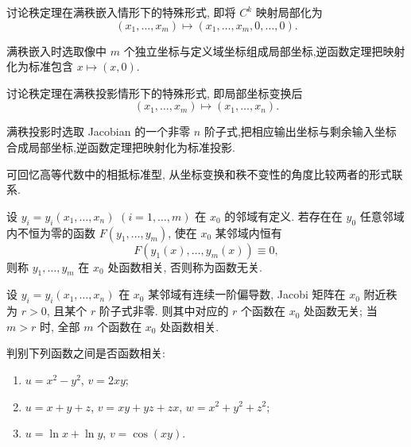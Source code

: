 \begin{example}
    讨论秩定理在满秩嵌入情形下的特殊形式, 即将 $C^k$ 映射局部化为
    \[
        (x_1,\ldots,x_m)\mapsto(x_1,\ldots,x_m,0,\ldots,0).
    \]
\end{example}
\exampleblank

\begin{solution}
    满秩嵌入时选取像中 $m$ 个独立坐标与定义域坐标组成局部坐标,逆函数定理把映射化为标准包含 $x\mapsto(x,0)$.
\end{solution}

\begin{example}
    讨论秩定理在满秩投影情形下的特殊形式, 即局部坐标变换后
    \[
        (x_1,\ldots,x_m)\mapsto(x_1,\ldots,x_n).
    \]
\end{example}
\exampleblank

\begin{solution}
    满秩投影时选取 Jacobian 的一个非零 $n$ 阶子式,把相应输出坐标与剩余输入坐标合成局部坐标,逆函数定理把映射化为标准投影.
\end{solution}

\begin{remark}
    可回忆高等代数中的相抵标准型, 从坐标变换和秩不变性的角度比较两者的形式联系.
\end{remark}




\begin{definition}
    设 $y_i=y_i(x_1,\ldots,x_n)$ $(i=1,\ldots,m)$ 在 $x_0$ 的邻域有定义. 若存在在 $y_0$ 任意邻域内不恒为零的函数 $F(y_1,\ldots,y_m)$, 使在 $x_0$ 某邻域内恒有
    \[
        F(y_1(x),\ldots,y_m(x))\equiv0,
    \]
    则称 $y_1,\ldots,y_m$ 在 $x_0$ 处函数相关, 否则称为函数无关.
\end{definition}

\begin{theorem}[\markstar]
    设 $y_i=y_i(x_1,\ldots,x_n)$ 在 $x_0$ 某邻域有连续一阶偏导数, Jacobi 矩阵在 $x_0$ 附近秩为 $r>0$, 且某个 $r$ 阶子式非零. 则其中对应的 $r$ 个函数在 $x_0$ 处函数无关; 当 $m>r$ 时, 全部 $m$ 个函数在 $x_0$ 处函数相关.
\end{theorem}

\begin{example}
    判别下列函数之间是否函数相关:
    \begin{enumerate}
        \item $u=x^2-y^2$, $v=2xy$;
        \item $u=x+y+z$, $v=xy+yz+zx$, $w=x^2+y^2+z^2$;
        \item $u=\ln x+\ln y$, $v=\cos(xy)$.
    \end{enumerate}
\end{example}
\exampleblank

